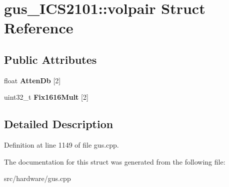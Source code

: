 \hypertarget{structgus__ICS2101_1_1volpair}{\section{gus\-\_\-\-I\-C\-S2101\-:\-:volpair Struct Reference}
\label{structgus__ICS2101_1_1volpair}
}
\subsection*{Public Attributes}
\begin{DoxyCompactItemize}
\item 
\hypertarget{structgus__ICS2101_1_1volpair_a02314a3a3ad17a789bc194f027a55728}{float {\bfseries Atten\-Db} \mbox{[}2\mbox{]}}\label{structgus__ICS2101_1_1volpair_a02314a3a3ad17a789bc194f027a55728}

\item 
\hypertarget{structgus__ICS2101_1_1volpair_a46cbc4d1df89d680f55e3bc2ab41baca}{uint32\-\_\-t {\bfseries Fix1616\-Mult} \mbox{[}2\mbox{]}}\label{structgus__ICS2101_1_1volpair_a46cbc4d1df89d680f55e3bc2ab41baca}

\end{DoxyCompactItemize}


\subsection{Detailed Description}


Definition at line 1149 of file gus.\-cpp.



The documentation for this struct was generated from the following file\-:\begin{DoxyCompactItemize}
\item 
src/hardware/gus.\-cpp\end{DoxyCompactItemize}
